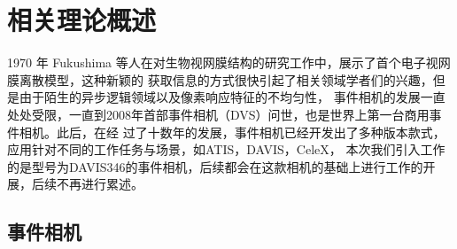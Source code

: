 \chapter{相关理论概述}
1970 年 Fukushima 等人\cite{fukushima1970electronic}在对生物视网膜结构的研究工作中，展示了首个电子视网膜离散模型，这种新颖的
获取信息的方式很快引起了相关领域学者们的兴趣，但是由于陌生的异步逻辑领域以及像素响应特征的不均匀性，
事件相机的发展一直处处受限，一直到2008年首部事件相机（DVS）问世，也是世界上第一台商用事件相机。此后，在经
过了十数年的发展，事件相机已经开发出了多种版本款式，应用针对不同的工作任务与场景，如ATIS，DAVIS，CeleX，
本次我们引入工作的是型号为DAVIS346的事件相机，后续都会在这款相机的基础上进行工作的开展，后续不再进行累述。

\section{事件相机}
